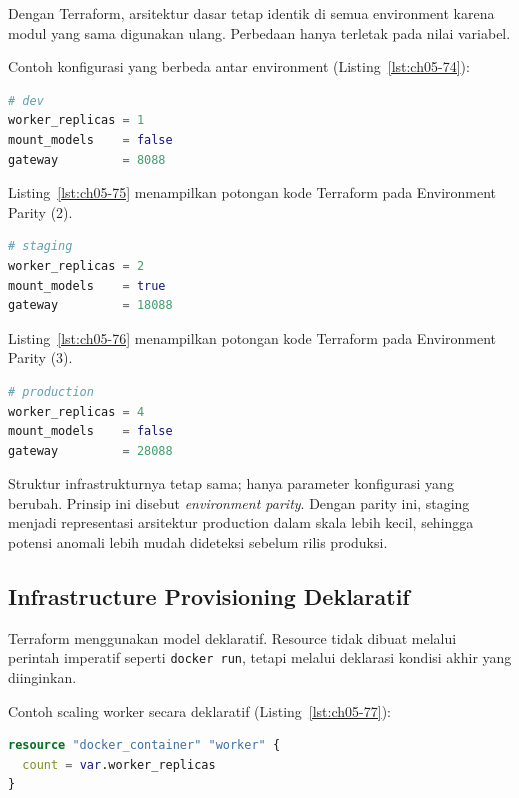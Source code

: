 Dengan Terraform, arsitektur dasar tetap identik di semua environment karena modul yang sama digunakan ulang. Perbedaan hanya terletak pada nilai variabel.

Contoh konfigurasi yang berbeda antar environment (Listing~\ref{lst:ch05-74}):

\begin{lstlisting}[language=terraform, caption={Potongan kode Terraform pada Environment Parity}, label={lst:ch05-74}]
# dev
worker_replicas = 1
mount_models    = false
gateway         = 8088
\end{lstlisting}


Listing~\ref{lst:ch05-75} menampilkan potongan kode Terraform pada Environment Parity (2).
\begin{lstlisting}[language=terraform, caption={Potongan kode Terraform pada Environment Parity (2)}, label={lst:ch05-75}]
# staging
worker_replicas = 2
mount_models    = true
gateway         = 18088
\end{lstlisting}


Listing~\ref{lst:ch05-76} menampilkan potongan kode Terraform pada Environment Parity (3).
\begin{lstlisting}[language=terraform, caption={Potongan kode Terraform pada Environment Parity (3)}, label={lst:ch05-76}]
# production
worker_replicas = 4
mount_models    = false
gateway         = 28088
\end{lstlisting}

Struktur infrastrukturnya tetap sama; hanya parameter konfigurasi yang berubah. Prinsip ini disebut \textit{environment parity}. Dengan parity ini, staging menjadi representasi arsitektur production dalam skala lebih kecil, sehingga potensi anomali lebih mudah dideteksi sebelum rilis produksi.

\subsection*{Infrastructure Provisioning Deklaratif}

Terraform menggunakan model deklaratif. Resource tidak dibuat melalui perintah imperatif seperti \texttt{docker run}, tetapi melalui deklarasi kondisi akhir yang diinginkan.

Contoh scaling worker secara deklaratif (Listing~\ref{lst:ch05-77}):

\begin{lstlisting}[language=terraform, caption={Potongan kode Terraform pada Infrastructure Provisioning Deklaratif}, label={lst:ch05-77}]
resource "docker_container" "worker" {
  count = var.worker_replicas
}
\end{lstlisting}

